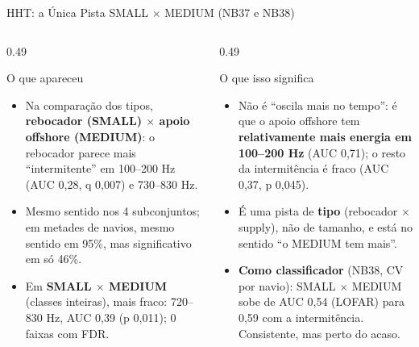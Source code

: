 \documentclass[aspectratio=169]{beamer}
\begin{document}
\begin{frame}{HHT: a Única Pista SMALL $\times$ MEDIUM (NB37 e NB38)}
    \footnotesize
    \begin{columns}[T]
        \begin{column}{0.49\textwidth}
            \begin{block}{\small O que apareceu}
                \scriptsize
                \begin{itemize}
                    \setlength{\itemsep}{2pt}
                    \item Na comparação dos tipos, \textbf{rebocador (SMALL) $\times$ apoio offshore (MEDIUM)}: o rebocador parece mais ``intermitente'' em 100--200 Hz (AUC 0,28, q 0,007) e 730--830 Hz.
                    \item Mesmo sentido nos 4 subconjuntos; em metades de navios, mesmo sentido em 95\%, mas significativo em só 46\%.
                    \item Em \textbf{SMALL $\times$ MEDIUM} (classes inteiras), mais fraco: 720--830 Hz, AUC 0,39 (p 0,011); 0 faixas com FDR.
                \end{itemize}
            \end{block}
        \end{column}
        \begin{column}{0.49\textwidth}
            \begin{block}{\small O que isso significa}
                \scriptsize
                \begin{itemize}
                    \setlength{\itemsep}{2pt}
                    \item Não é ``oscila mais no tempo'': é que o apoio offshore tem \textbf{relativamente mais energia em 100--200 Hz} (AUC 0,71); o resto da intermitência é fraco (AUC 0,37, p 0,045).
                    \item É uma pista de \textbf{tipo} (rebocador $\times$ supply), não de tamanho, e está no sentido ``o MEDIUM tem mais''.
                    \item \textbf{Como classificador} (NB38, CV por navio): SMALL $\times$ MEDIUM sobe de AUC 0,54 (LOFAR) para 0,59 com a intermitência. Consistente, mas perto do acaso.
                \end{itemize}
            \end{block}
        \end{column}
    \end{columns}
\end{frame}
\end{document}

